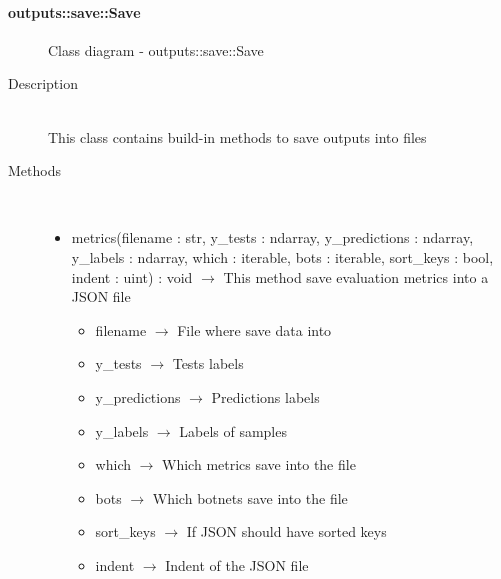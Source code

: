 \paragraph[Save]{outputs::save::Save}
 \hfill\begin{figure}[h]
\centering
{}
\caption{Class diagram - outputs::save::Save}
\end{figure}\begin{description}
\item[Description] \hfill \\
 This class contains build-in methods to save outputs into files
\item[Methods] \hfill \\
 \vspace{-1cm}
\begin{itemize}
\item metrics(filename : str, y\_tests : ndarray, y\_predictions : ndarray, y\_labels : ndarray, which : iterable, bots : iterable, sort\_keys : bool, indent : uint) : void $\rightarrow$ This method save evaluation metrics into a JSON file\begin{itemize}
\item filename $\rightarrow$ File where save data into
\item y\_tests $\rightarrow$ Tests labels
\item y\_predictions $\rightarrow$ Predictions labels
\item y\_labels $\rightarrow$ Labels of samples
\item which $\rightarrow$ Which metrics save into the file
\item bots $\rightarrow$ Which botnets save into the file
\item sort\_keys $\rightarrow$ If JSON should have sorted keys
\item indent $\rightarrow$ Indent of the JSON file
\end{itemize}


\end{itemize}
\end{description}
